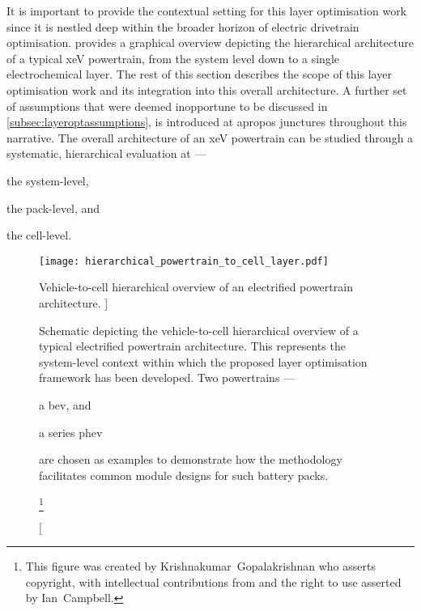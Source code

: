 

It is  important to provide the  contextual setting for this  layer optimisation
work since it is nestled deep  within the broader horizon of electric drivetrain
optimisation.   provides a  graphical overview
depicting the hierarchical architecture of  a typical \gls{xeV} powertrain, from
the  system level  down to  a  single electrochemical  layer. The  rest of  this
section describes the scope of this  layer optimisation work and its integration
into this  overall architecture. A further  set of assumptions that  were deemed
inopportune to be discussed  in \cref{subsec:layeroptassumptions}, is introduced
at apropos junctures  throughout this narrative. The overall  architecture of an
\gls{xeV}  powertrain  can  be  studied through  a  systematic,  hierarchical
evaluation at ---
\begin{enumerate*}[label=\itshape\alph*\upshape)]
    \item the system-level,
    \item the pack-level, and
    \item the cell-level.
\end{enumerate*}

\begin{figure}[!bp]
    \begin{minipage}[t]{\textwidth}
        \centering
        \texttt{[image: hierarchical\_powertrain\_to\_cell\_layer.pdf]}
        \captionsetup{labelsep=note}
        \caption
        [%
        Vehicle-to-cell hierarchical overview of an electrified powertrain architecture.
        ]%
        {%
            Schematic depicting the vehicle-to-cell hierarchical overview of
            a typical electrified powertrain architecture. This represents the
            system-level context within which the proposed layer optimisation framework
            has been developed. Two  powertrains ---
            \begin{enumerate*}[label=\itshape\alph*\upshape)]
                \item a \gls{bev}, and
                \item a series \gls{phev}
            \end{enumerate*}
            are chosen as examples to demonstrate how the methodology facilitates
            common module designs for such battery packs.
        }%
        \label{fig:fig_PowertrainSchematic}
        \mpfootnotes[1]
        \footnote{This figure was created by \mbox{Krishnakumar Gopalakrishnan} who
            asserts copyright, with intellectual contributions from and the right to
        use asserted by \mbox{Ian Campbell}.}
    \end{minipage}
\end{figure}


